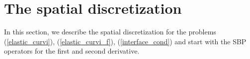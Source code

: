 \section{The spatial discretization}

In this section, we describe the spatial discretization for the problems (\ref{elastic_curvi}), (\ref{elastic_curvi_f}), (\ref{interface_cond}) and start with the SBP operators for the first and second derivative.

